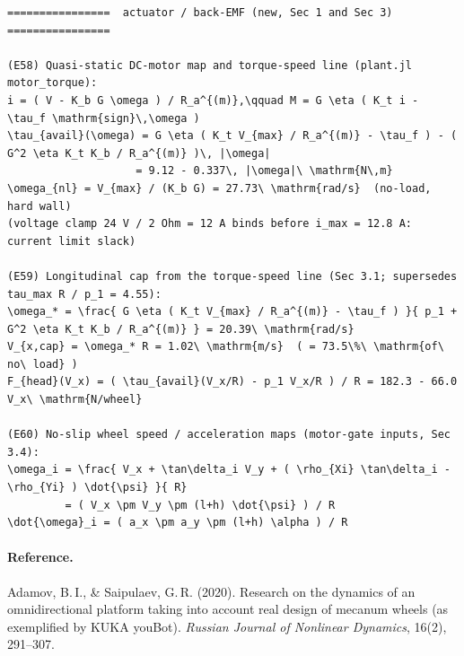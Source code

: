 \documentclass[11pt]{article}
\begin{document}
\begin{lstlisting}
================  actuator / back-EMF (new, Sec 1 and Sec 3)  ================

(E58) Quasi-static DC-motor map and torque-speed line (plant.jl motor_torque):
i = ( V - K_b G \omega ) / R_a^{(m)},\qquad M = G \eta ( K_t i - \tau_f \mathrm{sign}\,\omega )
\tau_{avail}(\omega) = G \eta ( K_t V_{max} / R_a^{(m)} - \tau_f ) - ( G^2 \eta K_t K_b / R_a^{(m)} )\, |\omega|
                    = 9.12 - 0.337\, |\omega|\ \mathrm{N\,m}
\omega_{nl} = V_{max} / (K_b G) = 27.73\ \mathrm{rad/s}  (no-load, hard wall)
(voltage clamp 24 V / 2 Ohm = 12 A binds before i_max = 12.8 A: current limit slack)

(E59) Longitudinal cap from the torque-speed line (Sec 3.1; supersedes tau_max R / p_1 = 4.55):
\omega_* = \frac{ G \eta ( K_t V_{max} / R_a^{(m)} - \tau_f ) }{ p_1 + G^2 \eta K_t K_b / R_a^{(m)} } = 20.39\ \mathrm{rad/s}
V_{x,cap} = \omega_* R = 1.02\ \mathrm{m/s}  ( = 73.5\%\ \mathrm{of\ no\ load} )
F_{head}(V_x) = ( \tau_{avail}(V_x/R) - p_1 V_x/R ) / R = 182.3 - 66.0 V_x\ \mathrm{N/wheel}

(E60) No-slip wheel speed / acceleration maps (motor-gate inputs, Sec 3.4):
\omega_i = \frac{ V_x + \tan\delta_i V_y + ( \rho_{Xi} \tan\delta_i - \rho_{Yi} ) \dot{\psi} }{ R}
         = ( V_x \pm V_y \pm (l+h) \dot{\psi} ) / R
\dot{\omega}_i = ( a_x \pm a_y \pm (l+h) \alpha ) / R
\end{lstlisting}

\paragraph{Reference.}
Adamov, B.\,I., \& Saipulaev, G.\,R. (2020). Research on the dynamics of an omnidirectional
platform taking into account real design of mecanum wheels (as exemplified by KUKA youBot).
\emph{Russian Journal of Nonlinear Dynamics}, 16(2), 291--307.
\end{document}
